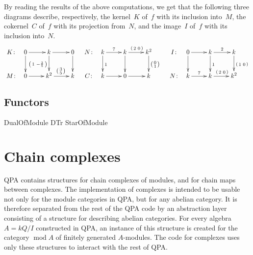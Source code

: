 \documentclass{amsart}
\renewcommand{\mod}{\operatorname{mod}\nolimits}
\theoremstyle{definition}
\newcommand{\vv}[2]{\left( \begin{smallmatrix} #1 & #2 \end{smallmatrix} \right)}
\theoremstyle{theoretic}
\begin{document}
By reading the results of the above computations, we get that the
following three diagrams describe, respectively, the kernel~$K$ of~$f$
with its inclusion into~$M$, the cokernel~$C$ of~$f$ with its projection
from~$N$, and the image~$I$ of~$f$ with its inclusion into~$N$.
\[
\xymatrix@C=.4em{
K\colon &
0 \ar[rrr]\ar[d] &&&
k \ar[rrr]\ar[d]_{\vv{1}{-\frac{3}{5}}} &&&
0 \ar[d]
\\
M\colon &
0 \ar[rrr] &&&
k^2 \ar[rrr]^{\left( \begin{smallmatrix} 3\\5 \end{smallmatrix} \right)} &&&
k
}
\quad
\xymatrix@C=.4em{
N\colon &
k \ar[rrr]^7\ar[d]^{1} &&&
k \ar[rrr]^{\vv{2}{0}}\ar[d] &&&
k^2 \ar[d]^{\left( \begin{smallmatrix} 0\\1 \end{smallmatrix} \right)}
\\
C\colon &
k \ar[rrr] &&&
0 \ar[rrr] &&&
k
}
\quad
\xymatrix@C=.4em{
I\colon &
0 \ar[rrr]\ar[d] &&&
k \ar[rrr]^2\ar[d]^1 &&&
k \ar[d]^{\vv{1}{0}}
\\
N\colon &
k \ar[rrr]^7 &&&
k \ar[rrr]^{\vv{2}{0}} &&&
k^2
}
\]


\subsection{Functors}
DualOfModule
DTr
StarOfModule

\section{Chain complexes}%

QPA contains structures for chain complexes of modules, and for chain
maps between complexes.  The implementation of complexes is intended
to be usable not only for the module categories in QPA, but for any
abelian category.  It is therefore separated from the rest of the QPA
code by an abstraction layer consisting of a structure for describing
abelian categories.  For every algebra $A = kQ/I$ constructed in QPA,
an instance of this structure is created for the category $\mod A$ of
finitely generated $A$-modules.  The code for complexes uses only
these structures to interact with the rest of QPA.
\end{document}
